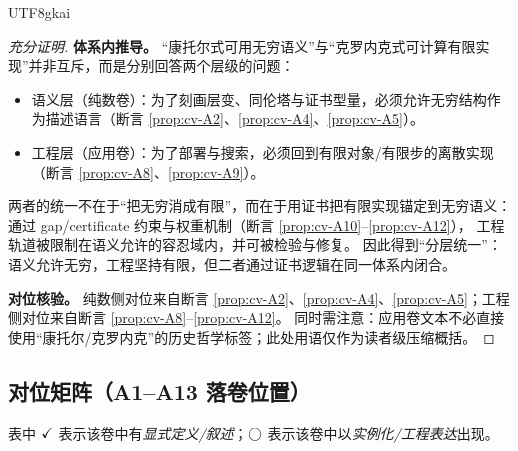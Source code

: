 \documentclass[12pt]{article}
\begin{document}
\begin{CJK*}{UTF8}{gkai}
\begin{proof}[充分证明]
\textbf{体系内推导。}
“康托尔式可用无穷语义”与“克罗内克式可计算有限实现”并非互斥，而是分别回答两个层级的问题：
\begin{itemize}
  \item 语义层（纯数卷）：为了刻画层变、同伦塔与证书型量，必须允许无穷结构作为描述语言（断言 \ref{prop:cv-A2}、\ref{prop:cv-A4}、\ref{prop:cv-A5}）。
  \item 工程层（应用卷）：为了部署与搜索，必须回到有限对象/有限步的离散实现（断言 \ref{prop:cv-A8}、\ref{prop:cv-A9}）。
\end{itemize}
两者的统一不在于“把无穷消成有限”，而在于用证书把有限实现锚定到无穷语义：通过 gap/certificate 约束与权重机制（断言 \ref{prop:cv-A10}--\ref{prop:cv-A12}），
  工程轨道被限制在语义允许的容忍域内，并可被检验与修复。
因此得到“分层统一”：语义允许无穷，工程坚持有限，但二者通过证书逻辑在同一体系内闭合。

\textbf{对位核验。}
纯数侧对位来自断言 \ref{prop:cv-A2}、\ref{prop:cv-A4}、\ref{prop:cv-A5}；工程侧对位来自断言 \ref{prop:cv-A8}--\ref{prop:cv-A12}。
同时需注意：应用卷文本不必直接使用“康托尔/克罗内克”的历史哲学标签；此处用语仅作为读者级压缩概括。
\end{proof}

\subsection{对位矩阵（A1--A13 落卷位置）}

表中 $\checkmark$ 表示该卷中有\emph{显式定义/叙述}；$\bigcirc$ 表示该卷中以\emph{实例化/工程表达}出现。


\end{CJK*}
\end{document}
